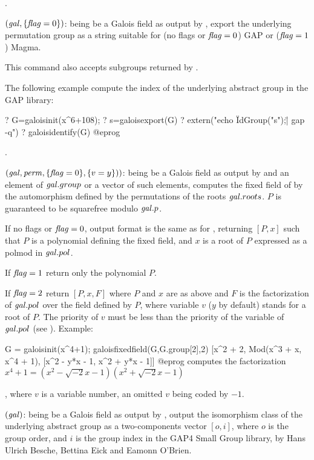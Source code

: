 .

$(\hbox{\it gal\/},\{\hbox{\it f\kern0pt lag\/}=0\})$:
 being be a Galois field as output by ,
export the underlying permutation group as a string suitable
for (no flags or $\hbox{\it f\kern0pt lag\/}=0$) GAP or ($\hbox{\it f\kern0pt lag\/}=1$) Magma.

This command also accepts subgroups returned by .

The following example compute the index of the underlying abstract
group in the GAP library:

\bprog
? G=galoisinit(x^6+108);
? s=galoisexport(G)
? extern("echo \"IdGroup("s");\"| gap -q")
? galoisidentify(G)
@eprog

.

$(\hbox{\it gal\/},\hbox{\it perm\/},\{\hbox{\it f\kern0pt lag\/}=0\},\{v=y\}))$:
 being be a Galois field as output by  and
 an element of $\hbox{\it gal\/}.group$ or a vector of such elements,
computes the fixed field of  by the automorphism defined by the
permutations  of the roots $\hbox{\it gal\/}.roots$. $P$ is guaranteed to
be squarefree modulo $\hbox{\it gal\/}.p$.

If no flags or $\hbox{\it f\kern0pt lag\/}=0$, output format is the same as for ,
returning $[P,x]$ such that $P$ is a polynomial defining the fixed field, and
$x$ is a root of $P$ expressed as a polmod in $\hbox{\it gal\/}.pol$.

If $\hbox{\it f\kern0pt lag\/}=1$ return only the polynomial $P$.

If $\hbox{\it f\kern0pt lag\/}=2$ return $[P,x,F]$ where $P$ and $x$ are as above and $F$ is the
factorization of $\hbox{\it gal\/}.pol$ over the field defined by $P$, where
variable $v$ ($y$ by default) stands for a root of $P$. The priority of $v$
must be less than the priority of the variable of $\hbox{\it gal\/}.pol$ (see
). Example:

\bprog
G = galoisinit(x^4+1);
galoisfixedfield(G,G.group[2],2)
  [x^2 + 2, Mod(x^3 + x, x^4 + 1), [x^2 - y*x - 1, x^2 + y*x - 1]]
@eprog
computes the factorization  $x^4+1=(x^2-\sqrt{-2}x-1)(x^2+\sqrt{-2}x-1)$

, where $v$ is a variable number, an omitted $v$ being coded by $-1$.

$(\hbox{\it gal\/})$:
 being be a Galois field as output by ,
output the isomorphism class of the underlying abstract group as a
two-components vector $[o,i]$, where $o$ is the group order, and $i$ is the
group index in the GAP4 Small Group library, by Hans Ulrich Besche, Bettina
Eick and Eamonn O'Brien.


